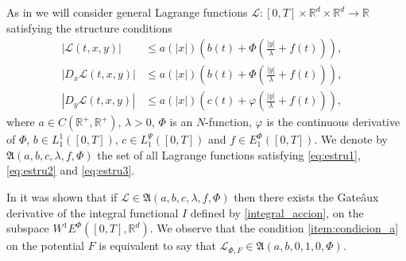 \documentclass[twoside]{elsarticle}
\theoremstyle{remark}
\newcommand{\lpsi}{L^{\Psi}}
\newcommand{\ephi}{E^{\Phi}}
\newcommand{\wphie}{W^{1}\ephi}
\newcommand{\rr}{\mathbb{R}}
\renewcommand{\leq}{\leqslant}
\begin{document}
As in  \cite{ABGMS2015} we will consider general Lagrange functions
$\mathcal{L}:[0,T]\times\rr^d\times\rr^d\to\rr$
satisfying the structure conditions
\begin{align}
|\mathcal{L}(t,x,y)| &\leq a(|x|)\left(b(t)+ \Phi\left(\frac{|y|}{\lambda}+f(t) \right)\right),&\tag{$A_1$}\label{eq:estru1}
\\
|D_{x}\mathcal{L}(t,x,y)| &\leq a(|x|)\left(b(t)+ \Phi\left(\frac{|y|}{\lambda}+f(t) \right)\right),&\tag{$A_2$}\label{eq:estru2}
\\
|D_{y}\mathcal{L}(t,x,y)| &\leq a(|x|)\left(c(t)+ \varphi\left(\frac{|y|}{\lambda}+f(t)\right)\right),
&\tag{$A_3$}\label{eq:estru3}
\end{align}
where $a\in C(\mathbb{R}^+,\mathbb{R}^+)$, $\lambda>0$, $\Phi$ is an $N$-function,
$\varphi$ is the continuous derivative of $\Phi$,
$b\in L^1_1([0,T])$,  $c\in\lpsi_1([0,T])$ and  $f\in \ephi_1([0,T])$. We denote by $\mathfrak{A}(a,b,c,\lambda,f,\Phi)$ the set of all Lagrange functions satisfying  \eqref{eq:estru1}, \eqref{eq:estru2} and \eqref{eq:estru3}.




In
\cite{ABGMS2015} it was shown that if $\mathcal{L}\in \mathfrak{A}(a,b,c,\lambda,f,\Phi)$
then there  exists the Gate\^aux derivative of the integral functional $I$ defined by \eqref{integral_accion},
on the subspace $\wphie([0,T],\rr^d)$. We observe that the condition \ref{item:condicion_a} on the potential $F$ is equivalent to say that $\mathcal{L}_{\Phi,F}\in \mathfrak{A}(a,b,0,1,0,\Phi)$.
\end{document}
